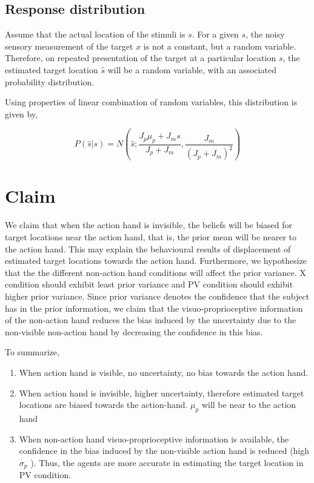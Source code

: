 \subsection{Response distribution}

Assume that the actual location of the stimuli is $s$. For a given $s$, the noisy sensory measurement of the target $x$ is not a constant, but a random variable. Therefore, on repeated presentation of the target at a particular location $s$, the estimated target location $\hat{s}$ will be a random variable, with an associated probability distribution.

Using properties of linear combination of random variables, this distribution is given by,

\begin{equation} \label{eq:rd}
     P(\hat{s} | s) = N (\hat{s};  \frac{J_p \mu_p + J_m s}{J_p + J_m} , \frac{J_m}{(J_p + J_m)^2} ) 
\end{equation}



\section{Claim}

We claim that when the action hand is invisible, the beliefs will be biased for target locations near the action hand, that is, the prior mean will be nearer to the action hand. This may explain the behavioural results of displacement of estimated target locations towards the action hand. Furthermore, we hypothesize that the the different non-action hand conditions will affect the prior variance. X condition should exhibit least prior variance and PV condition should exhibit higher prior variance. Since prior variance denotes the confidence that the subject has in the prior information, we claim that the visuo-proprioceptive information of the non-action hand reduces the bias induced by the uncertainty due to the non-visible non-action hand by decreasing the confidence in this bias.


To summarize,

\begin{enumerate}
    \item When action hand is visible, no uncertainty, no bias towards the action hand.
    \item When action hand is invisible, higher uncertainty, therefore estimated target locations are biased towards the action-hand. $\mu_p$ will be near to the action hand
    \item When non-action hand visuo-proprioceptive information is available, the confidence in the bias induced by the non-visible action hand is reduced (high $\sigma_p$ ). Thus, the agents are more accurate in estimating the target location in PV condition.
\end{enumerate}


